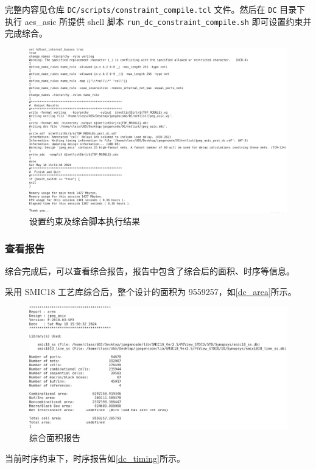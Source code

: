 \documentclass[12pt,hyperref,a4paper,UTF8]{ctexart}
\begin{document}
完整内容见仓库 \texttt{DC/scripts/constraint\_compile.tcl} 文件。然后在 \texttt{DC} 目录下执行
aes\_asic 所提供 shell 脚本 \texttt{run\_dc\_constraint\_compile.sh} 即可设置约束并完成综合。
\begin{figure}[htbp]
    \centering
    \includegraphics[width =.9\textwidth]{figures/dc_constraint_compile.png}
    \caption{设置约束及综合脚本执行结果}
    \label{dc_constraint_compile}
\end{figure}

\subsubsection{查看报告}
综合完成后，可以查看综合报告，报告中包含了综合后的面积、时序等信息。

采用 SMIC18 工艺库综合后，整个设计的面积为 9559257，如\autoref{dc_area}所示。
\begin{figure}[htbp]
    \centering
    \includegraphics[width =.9\textwidth]{figures/dc_area.png}
    \caption{综合面积报告}
    \label{dc_area}
\end{figure}
\newpage

当前时序约束下，时序报告如\autoref{dc_timing}所示。
\end{document}
